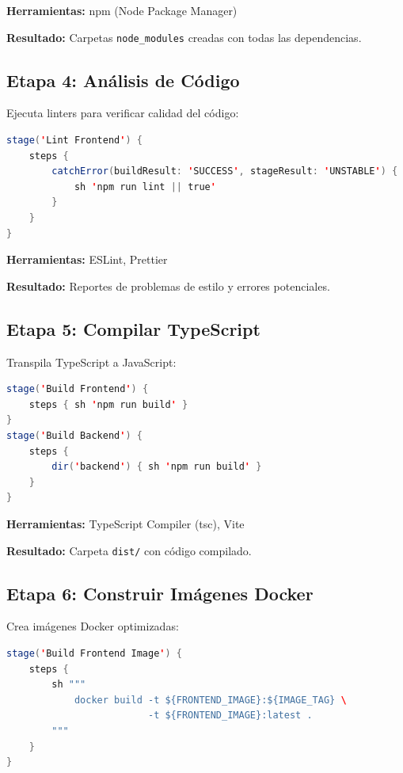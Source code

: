 \documentclass[12pt,a4paper]{article}
\begin{document}
\textbf{Herramientas:} npm (Node Package Manager)

\textbf{Resultado:} Carpetas \texttt{node\_modules} creadas con todas las dependencias.

\subsection{Etapa 4: Análisis de Código}

Ejecuta linters para verificar calidad del código:

\begin{lstlisting}[language=Java]
stage('Lint Frontend') {
    steps {
        catchError(buildResult: 'SUCCESS', stageResult: 'UNSTABLE') {
            sh 'npm run lint || true'
        }
    }
}
\end{lstlisting}

\textbf{Herramientas:} ESLint, Prettier

\textbf{Resultado:} Reportes de problemas de estilo y errores potenciales.

\subsection{Etapa 5: Compilar TypeScript}

Transpila TypeScript a JavaScript:

\begin{lstlisting}[language=Java]
stage('Build Frontend') {
    steps { sh 'npm run build' }
}
stage('Build Backend') {
    steps {
        dir('backend') { sh 'npm run build' }
    }
}
\end{lstlisting}

\textbf{Herramientas:} TypeScript Compiler (tsc), Vite

\textbf{Resultado:} Carpeta \texttt{dist/} con código compilado.

\subsection{Etapa 6: Construir Imágenes Docker}

Crea imágenes Docker optimizadas:

\begin{lstlisting}[language=Java]
stage('Build Frontend Image') {
    steps {
        sh """
            docker build -t ${FRONTEND_IMAGE}:${IMAGE_TAG} \
                         -t ${FRONTEND_IMAGE}:latest .
        """
    }
}
\end{lstlisting}
\end{document}
